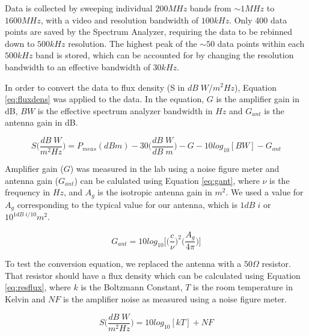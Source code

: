 Data is collected by sweeping individual $200 MHz$ bands from $\sim1 MHz$ to $1600 MHz$, with a video and resolution bandwidth of $100 kHz$. Only 400 data points are saved by the Spectrum Analyzer, requiring the data to be rebinned down to $500 kHz$ resolution. The highest peak of the $\sim50$ data points within each $500 kHz$ band is stored, which can be accounted for by changing the resolution bandwidth to an effective bandwidth of $30 kHz$. 

In order to convert the data to flux density (S in $dB \; W/m^2Hz$), Equation \ref{eq:fluxdens} was applied to the data. In the equation, $G$ is the amplifier gain in dB, $BW$ is the effective spectrum analyzer bandwidth in $Hz$ and $G_{ant}$ is the antenna gain in dB. 

\begin{equation}\label{eq:fluxdens}
S \Bigg( \frac{dB \; W}{m^2 Hz} \Bigg) = P_{meas} (dBm) - 30 \Bigg( \frac{dB \; W}{dB \;m} \Bigg) - G - 10log_{10} [BW] - G_{ant}
\end{equation}

Amplifier gain ($G$) was measured in the lab using a noise figure meter and antenna gain ($G_{ant}$) can be calulated using Equation \ref{eq:gant}, where $\nu$ is the frequency in $Hz$, and $A_g$ is the isotropic antenna gain in $m^2$. We used a value for $A_g$ corresponding to the typical value for our antenna, which is $1 dB \;i$ or $10^{1dB \;i/10} m^2$. 

\begin{equation}\label{eq:gant}
G_{ant}= 10 log_{10} \Bigg[ \Bigg(\frac{c}{\nu} \Bigg)^2 \Bigg( \frac{A_g}{4 \pi} \Bigg) \Bigg]
\end{equation}

To test the conversion equation, we replaced the antenna with a $50 \Omega$ resistor. That resistor should have a flux density which can be calculated using Equation \ref{eq:resflux}, where $k$ is the Boltzmann Constant, $T$ is the room temperature in Kelvin and $NF$ is the amplifier noise as measured using a noise figure meter. 

\begin{equation}\label{eq:resflux}
S \Bigg( \frac{dB \; W}{m^2 Hz} \Bigg) = 10 log_{10} [k T] + NF 
\end{equation}

